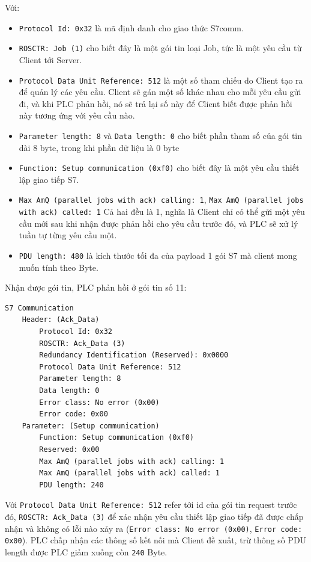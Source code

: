 \documentclass[../main.tex]{subfiles}
\begin{document}
Với:

\begin{itemize}
    \item \texttt{Protocol Id: 0x32} là mã định danh cho giao thức S7comm.
    \item \texttt{ROSCTR: Job (1)} cho biết đây là một gói tin loại Job, tức là một yêu cầu từ Client tới Server.

    \item \texttt{Protocol Data Unit Reference: 512} là một số tham chiếu do Client tạo ra để quản lý các yêu cầu. Client sẽ gán một số khác nhau cho mỗi yêu cầu gửi đi, và khi PLC phản hồi, nó sẽ trả lại số này để Client biết được phản hồi này tương ứng với yêu cầu nào.

    \item \texttt{Parameter length: 8} và \texttt{Data length: 0} cho biết phần tham số của gói tin dài 8 byte, trong khi phần dữ liệu là 0 byte

    \item \texttt{Function: Setup communication (0xf0)} cho biết đây là một yêu cầu thiết lập giao tiếp S7.

    \item \texttt{Max AmQ (parallel jobs with ack) calling: 1}, \texttt{Max AmQ (parallel jobs with ack) called: 1} Cả hai đều là 1, nghĩa là Client chỉ có thể gửi một yêu cầu mới sau khi nhận được phản hồi cho yêu cầu trước đó, và PLC sẽ xử lý tuần tự từng yêu cầu một.

    \item \texttt{PDU length: 480} là kích thước tối đa của payload 1 gói S7 mà client mong muốn tính theo Byte.
\end{itemize}

Nhận được gói tin, PLC phản hồi ở gói tin số 11:

\begin{verbatim}
S7 Communication
    Header: (Ack_Data)
        Protocol Id: 0x32
        ROSCTR: Ack_Data (3)
        Redundancy Identification (Reserved): 0x0000
        Protocol Data Unit Reference: 512
        Parameter length: 8
        Data length: 0
        Error class: No error (0x00)
        Error code: 0x00
    Parameter: (Setup communication)
        Function: Setup communication (0xf0)
        Reserved: 0x00
        Max AmQ (parallel jobs with ack) calling: 1
        Max AmQ (parallel jobs with ack) called: 1
        PDU length: 240
\end{verbatim}

Với \texttt{Protocol Data Unit Reference: 512} refer tới id của gói tin request trước đó, \texttt{ROSCTR: Ack\_Data (3)} để xác nhận yêu cầu thiết lập giao tiếp đã được chấp nhận và không có lỗi nào xảy ra (\texttt{Error class: No error (0x00)}, \texttt{Error code: 0x00}). PLC chấp nhận các thông số kết nối mà Client đề xuất, trừ thông số PDU length được PLC giảm xuống còn \texttt{240} Byte.
\end{document}
